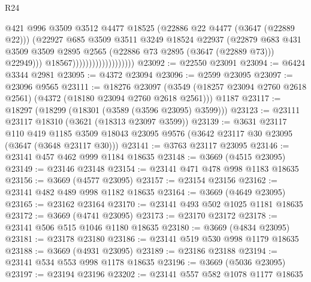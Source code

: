 \begin{lexlean}{R24}
\begin{coremodule}
                                            @421
                                            @996
                                            @3509
                                            @3512
                                            @4477
                                            @18525
                                            (@22886 @22 @4477 (@3647 (@22889 @22)))
                                            (@22927
                                              @685
                                              @3509
                                              @3511
                                              @3249
                                              @18524
                                              @22937
                                              (@22879
                                                @683
                                                @431
                                                @3509
                                                @3509
                                                @2895
                                                @2565
                                                (@22886 @73 @2895 (@3647 (@22889 @73)))
                                                @22949)))
                                          @18567)))))))))))))))))))
@23092 := @22550 @23091
@23094 := @6424 @3344 @2981
@23095 := @4372 @23094
@23096 := @2599 @23095
@23097 := @23096 @9565
@23111 := @18276
    @23097
    (@3549 (@18257 @23094 @2760 @2618 @2561) (@4372 (@18180 @23094 @2760 @2618 @2561)))
    @1187
@23117 := @18297 (@18299 (@18301 (@3589 (@3596 @23095) @3599)))
@23123 := @23111 @23117 @18310 (@3621 (@18313 @23097 @3599))
@23139 := @3631
    @23117
    @110
    @419
    @1185
    @3509
    @18043
    @23095
    @9576
    (@3642 @23117 @30 @23095 (@3647 (@3648 @23117 @30)))
@23141 := @3763 @23117 @23095
@23146 := @23141 @457 @462 @999 @1184 @18635
@23148 := @3669 (@4515 @23095)
@23149 := @23146 @23148
@23154 := @23141 @471 @478 @998 @1183 @18635
@23156 := @3669 (@4577 @23095)
@23157 := @23154 @23156
@23162 := @23141 @482 @489 @998 @1182 @18635
@23164 := @3669 (@4649 @23095)
@23165 := @23162 @23164
@23170 := @23141 @493 @502 @1025 @1181 @18635
@23172 := @3669 (@4741 @23095)
@23173 := @23170 @23172
@23178 := @23141 @506 @515 @1046 @1180 @18635
@23180 := @3669 (@4834 @23095)
@23181 := @23178 @23180
@23186 := @23141 @519 @530 @998 @1179 @18635
@23188 := @3669 (@4931 @23095)
@23189 := @23186 @23188
@23194 := @23141 @534 @553 @998 @1178 @18635
@23196 := @3669 (@5036 @23095)
@23197 := @23194 @23196
@23202 := @23141 @557 @582 @1078 @1177 @18635

\end{coremodule}
\end{lexlean}

